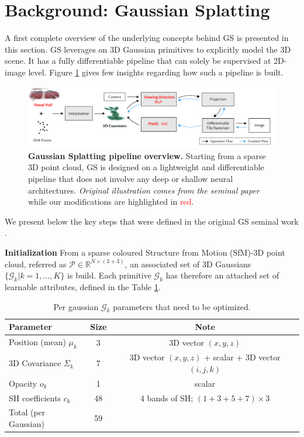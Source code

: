 \section{Background: Gaussian Splatting}

A first complete overview of the underlying concepts behind GS is presented in this section. GS leverages on 3D Gaussian primitives to explicitly model the 3D scene. It has a fully differentiable pipeline that can solely be supervised at 2D-image level. Figure \ref{fig:gs-overview} gives few insights regarding how such a pipeline is built. \newline

\begin{figure}[htb!]
    \center
  \includegraphics[width=\linewidth]{images/gaussiansplatting/overview_pipeline.png}
  \caption{\textbf{Gaussian Splatting pipeline overview.} Starting from a sparse 3D point cloud, GS is designed on a lightweight and differentiable pipeline that does not involve any deep or shallow neural architectures. \textit{Original illustration comes from the seminal paper}\cite{kerbl20233d} while our modifications are highlighted in \textcolor{red}{red}.}
  \label{fig:gs-overview}
\end{figure}

We present below the key steps that were defined in the original GS seminal work \cite{kerbl20233d}.


\noindent \textbf{Initialization} From a sparse coloured Structure from Motion (SfM)-3D point cloud, referred as $\mathcal{P}\in\mathbb{R}^{N\times(3+3)}$, an associated set of 3D Gaussians $\{\mathcal{G}_{k}|k=1,...,K\}$ is build. Each primitive $\mathcal{G}_{k} $ has therefore an attached set of learnable attributes, defined in the Table \ref{tab:gauss-param}. 


\begin{table}[h!]
  \centering
   \caption{Per gaussian $\mathcal{G}_{k} $  parameters that need to be optimized.}
  \begin{tabular}{lcc}
  \hline
  Parameter  & Size & Note \\
  \hline
  Position (mean)  $\mu_{k}$ & 3 & 3D vector $(x, y, z)$ \\
  3D Covariance $\Sigma_{k}$ & 7 & 3D vector $(x, y, z)$ + scalar + 3D vector  $(i, j, k)$\\
  Opacity  $o_{k}$ & 1 & scalar \\
  SH coefficients  $c_{k}$ & 48 & 4 bands of SH; $(1+3+5+7)\times3$ \\
  \hline
  Total (per Gaussian)  & 59 & \\
  \hline
  \end{tabular}
 
  \label{tab:gauss-param}
\end{table}

